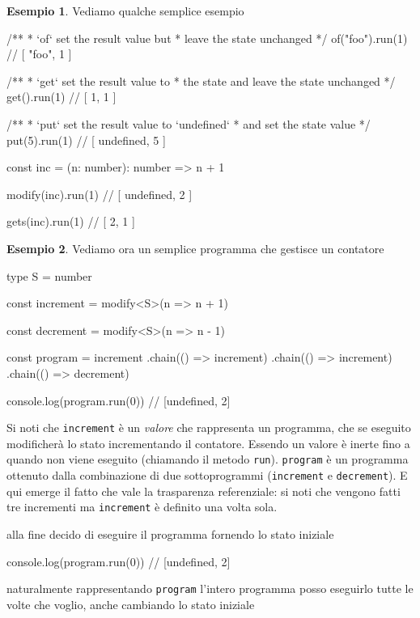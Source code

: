 \documentclass[12pt]{article}
\theoremstyle{definition}
\newtheorem{example}{Esempio}[section]
\newenvironment{code}
  {\vspace{0.5cm} \VerbatimEnvironment\begin{typescriptcode}}
  {\end{typescriptcode} \vspace{0.2cm}}
\begin{document}
\begin{example}
Vediamo qualche semplice esempio

\begin{code}
/**
 * `of` set the result value but
 * leave the state unchanged
 */
of("foo").run(1) // [ "foo", 1 ]

/**
 * `get` set the result value to
 * the state and leave the state unchanged
 */
get().run(1) // [ 1, 1 ]

/**
 * `put` set the result value to `undefined`
 * and set the state value
 */
put(5).run(1) // [ undefined, 5 ]

const inc = (n: number): number => n + 1

modify(inc).run(1) // [ undefined, 2 ]

gets(inc).run(1) // [ 2, 1 ]
\end{code}
\end{example}

\begin{example}
Vediamo ora un semplice programma che gestisce un contatore

\begin{code}
type S = number

const increment = modify<S>(n => n + 1)

const decrement = modify<S>(n => n - 1)

const program = increment
  .chain(() => increment)
  .chain(() => increment)
  .chain(() => decrement)

console.log(program.run(0)) // [undefined, 2]
\end{code}
\end{example}

Si noti che \texttt{increment} è un \emph{valore} che rappresenta un programma, che se eseguito
modificherà lo stato incrementando il contatore.
Essendo un valore è inerte fino a quando non viene eseguito (chiamando il metodo \texttt{run}).
\texttt{program} è un programma ottenuto dalla combinazione di due sottoprogrammi (\texttt{increment} e \texttt{decrement}).
E qui emerge il fatto che vale la trasparenza referenziale: si noti che vengono fatti tre incrementi
ma \texttt{increment} è definito una volta sola.

alla fine decido di eseguire il programma fornendo lo stato iniziale

\begin{code}
console.log(program.run(0)) // [undefined, 2]
\end{code}

naturalmente rappresentando \texttt{program} l'intero programma posso eseguirlo tutte le volte che voglio,
anche cambiando lo stato iniziale
\end{document}

